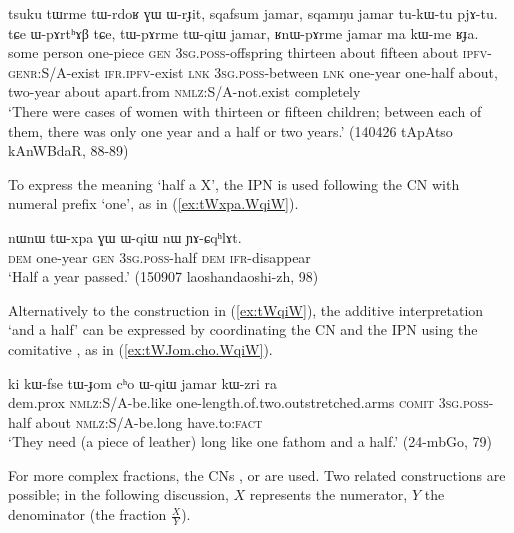 \begin{exe}
\ex \label{ex:tWqiW}
 \gll tsuku tɯrme tɯ-rdoʁ ɣɯ ɯ-rɟit, sqafsum jamar, sqamŋu jamar tu-kɯ-tu pjɤ-tu. tɕe ɯ-pɤrtʰɤβ tɕe, tɯ-pɤrme tɯ-qiɯ jamar, ʁnɯ-pɤrme jamar ma kɯ-me ʁɟa. \\
 some person one-piece \textsc{gen} \textsc{3sg}.\textsc{poss}-offspring thirteen about fifteen about \textsc{ipfv}-\textsc{genr}:S/A-exist \textsc{ifr}.\textsc{ipfv}-exist  \textsc{lnk} \textsc{3sg}.\textsc{poss}-between \textsc{lnk} one-year one-half about, two-year about apart.from \textsc{nmlz}:S/A-not.exist completely  \\
 \glt  `There were cases of women with thirteen or fifteen children; between each of them, there was only one year and a half or two years.' (140426 tApAtso kAnWBdaR, 88-89)
\end{exe}

To express the meaning `half a X', the IPN  is used following the CN with numeral prefix `one', as in (\ref{ex:tWxpa.WqiW}).

\begin{exe}
\ex \label{ex:tWxpa.WqiW}
 \gll nɯnɯ tɯ-xpa ɣɯ ɯ-qiɯ nɯ ɲɤ-ɕqʰlɤt. \\
\textsc{dem} one-year \textsc{gen} \textsc{3sg}.\textsc{poss}-half \textsc{dem} \textsc{ifr}-disappear \\
\glt  `Half a year passed.' (150907 laoshandaoshi-zh, 98)
\end{exe}

Alternatively to the construction in (\ref{ex:tWqiW}), the additive interpretation  `and a half' can be expressed by coordinating the CN and the IPN  using the comitative , as in (\ref{ex:tWJom.cho.WqiW}).

\begin{exe}
\ex \label{ex:tWJom.cho.WqiW}
 \gll ki kɯ-fse tɯ-ɟom cʰo ɯ-qiɯ jamar kɯ-zri ra \\
 dem.prox \textsc{nmlz}:S/A-be.like one-length.of.two.outstretched.arms \textsc{comit} \textsc{3sg}.\textsc{poss}-half about \textsc{nmlz}:S/A-be.long have.to:\textsc{fact} \\
\glt `They need (a piece of leather) long like one fathom and a half.' (24-mbGo, 79)
\end{exe}

For more complex fractions, the CNs ,  or  are used. Two related constructions are possible; in the following discussion, $X$ represents the numerator, $Y$ the denominator (the fraction $\frac{X}{Y}$). 

